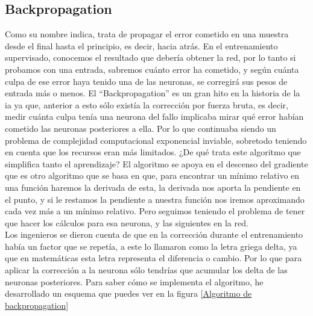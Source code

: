 \subsection{Backpropagation}
Como su nombre indica, trata de propagar el error cometido en una muestra desde el final hasta el principio, es decir, hacia atrás. En el entrenamiento supervisado, conocemos el resultado que debería obtener la red, por lo tanto si probamos con una entrada, sabremos cuánto error ha cometido, y según cuánta culpa de ese error haya tenido una de las neuronas, se corregirá sus pesos de entrada más o menos.
El ``Backpropagation'' es un gran hito en la historia de la \gls{ia} ya que, anterior a esto sólo existía la corrección por fuerza bruta, es decir, medir cuánta culpa tenía una neurona del fallo implicaba mirar qué error habían cometido las neuronas posteriores a ella. Por lo que continuaba siendo un problema de complejidad computacional exponencial inviable, sobretodo teniendo en cuenta que los recursos eran más limitados.
¿De qué trata este algoritmo que simplifica tanto el aprendizaje? El algoritmo se apoya en el descenso del gradiente que es otro algoritmo que se basa en que, para encontrar un mínimo relativo en una función haremos la derivada de esta, la derivada nos aporta la pendiente en el punto, y si le restamos la pendiente a nuestra función nos iremos aproximando cada vez más a un mínimo relativo. Pero seguimos teniendo el problema de tener que hacer los cálculos para esa neurona, y las siguientes en la red.
\\
Los ingenieros se dieron cuenta de que en la corrección durante el entrenamiento había un factor que se repetía, a este lo llamaron como la letra griega delta, ya que en matemáticas esta letra representa el diferencia o cambio. Por lo que para aplicar la corrección a la neurona sólo tendrías que acumular los delta de las neuronas posteriores. Para saber cómo se implementa el algoritmo, he desarrollado un esquema que puedes ver en la figura \ref{Algoritmo de backpropagation}

